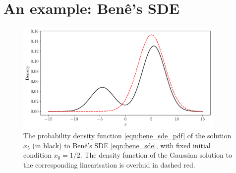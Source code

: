 \section{An example: Ben\^e's SDE}
\begin{figure}
	\centering
	\includegraphics[width=0.9\textwidth]{chp05_gmm/figures/bene_final_gauss_5.0.pdf}
	\caption{The probability density function \cref{eqn:bene_sde_pdf} of the solution \(x_5\) (in black) to Ben\^e's SDE \cref{eqn:bene_sde}, with fixed initial condition \(x_0 = 1/2\).
		The density function of the Gaussian solution to the corresponding linearisation is overlaid in dashed red.}
	\label{fig:bene_gauss}
\end{figure}

